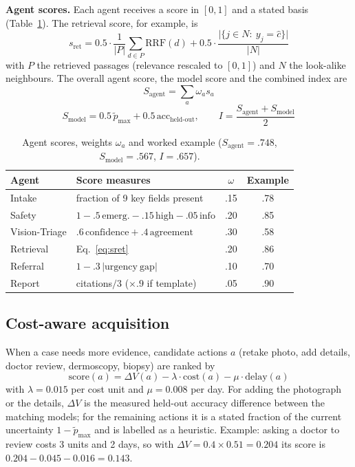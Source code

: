 \documentclass[conference]{IEEEtran}
\begin{document}
\textbf{Agent scores.} Each agent receives a score in $[0,1]$ and a stated basis (Table~\ref{tab:agents}). The retrieval score, for example, is
\begin{equation}
s_{\mathrm{ret}}=0.5\cdot\frac1{|P|}\sum_{d\in P}\mathrm{RRF}(d)+0.5\cdot\frac{\bigl|\{j\in N:\ y_j=\hat c\}\bigr|}{|N|}
\label{eq:sret}
\end{equation}
with $P$ the retrieved passages (relevance rescaled to $[0,1]$) and $N$ the look-alike neighbours. The overall agent score, the model score and the combined index are
\begin{equation}
S_{\mathrm{agent}}=\sum_{a}\omega_a s_a
\label{eq:sagent}
\end{equation}
\begin{equation}
S_{\mathrm{model}}=0.5\,\tilde p_{\max}+0.5\,\mathrm{acc}_{\mathrm{held\text{-}out}},\qquad
I=\frac{S_{\mathrm{agent}}+S_{\mathrm{model}}}{2}
\label{eq:smodel}
\end{equation}

\begin{table}[!t]
\caption{Agent scores, weights $\omega_a$ and worked example ($S_{\mathrm{agent}}=.748$, $S_{\mathrm{model}}=.567$, $I=.657$).}
\label{tab:agents}
\centering\footnotesize
\begin{tabular}{llcc}
\toprule
Agent & Score measures & $\omega$ & Example \\
\midrule
Intake & fraction of 9 key fields present & .15 & .78 \\
Safety & $1-.5\,\mathrm{emerg.}-.15\,\mathrm{high}-.05\,\mathrm{info}$ & .20 & .85 \\
Vision-Triage & $.6\,\mathrm{confidence}+.4\,\mathrm{agreement}$ & .30 & .58 \\
Retrieval & Eq.~\eqref{eq:sret} & .20 & .86 \\
Referral & $1-.3\,|\mathrm{urgency\ gap}|$ & .10 & .70 \\
Report & citations$/3$ ($\times .9$ if template) & .05 & .90 \\
\bottomrule
\end{tabular}
\end{table}


\subsection{Cost-aware acquisition}
When a case needs more evidence, candidate actions $a$ (retake photo, add details, doctor review, dermoscopy, biopsy) are ranked by
\begin{equation}
\mathrm{score}(a)=\Delta V(a)-\lambda\cdot\mathrm{cost}(a)-\mu\cdot\mathrm{delay}(a)
\label{eq:acq}
\end{equation}
with $\lambda=0.015$ per cost unit and $\mu=0.008$ per day. For adding the photograph or the details, $\Delta V$ is the measured held-out accuracy difference between the matching models; for the remaining actions it is a stated fraction of the current uncertainty $1-\tilde p_{\max}$ and is labelled as a heuristic. Example: asking a doctor to review costs 3 units and 2 days, so with $\Delta V=0.4\times0.51=0.204$ its score is $0.204-0.045-0.016=0.143$.
\end{document}
